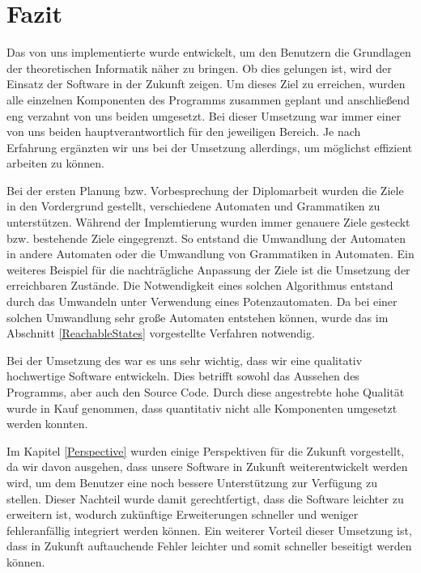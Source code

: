 



\chapter{Fazit}\label{Conclusion}

Das von uns implementierte \gtitool wurde entwickelt, um den Benutzern die
Grundlagen der theoretischen Informatik näher zu bringen. Ob dies gelungen ist,
wird der Einsatz der Software in der Zukunft zeigen. Um dieses Ziel zu erreichen,
wurden alle einzelnen Komponenten des Programms zusammen geplant und anschließend
eng verzahnt von uns beiden umgesetzt. Bei dieser Umsetzung war immer einer von
uns beiden hauptverantwortlich für den jeweiligen Bereich. Je nach Erfahrung
ergänzten wir uns bei der Umsetzung allerdings, um möglichst effizient arbeiten
zu können.\vspace{10pt}

Bei der ersten Planung bzw. Vorbesprechung der Diplomarbeit wurden die Ziele in
den Vordergrund gestellt, verschiedene Automaten und Grammatiken zu
unterstützen. Während der Implemtierung wurden immer genauere Ziele gesteckt
bzw. bestehende Ziele eingegrenzt. So entstand die Umwandlung der Automaten in
andere Automaten oder die Umwandlung von Grammatiken in Automaten. Ein weiteres
Beispiel für die nachträgliche Anpassung der Ziele ist die Umsetzung der
erreichbaren Zustände. Die Notwendigkeit eines solchen Algorithmus entstand
durch das Umwandeln unter Verwendung eines Potenzautomaten. Da bei einer
solchen Umwandlung sehr große Automaten entstehen können, wurde das im
Abschnitt \ref{ReachableStates} vorgestellte Verfahren notwendig.\vspace{10pt}

Bei der Umsetzung des \gtitools war es uns sehr wichtig, dass wir eine
qualitativ hochwertige Software entwickeln. Dies betrifft sowohl das
Aussehen des Programms, aber auch den Source Code. Durch diese angestrebte hohe
Qualität wurde in Kauf genommen, dass quantitativ nicht alle Komponenten
umgesetzt werden konnten.\vspace{10pt}

Im Kapitel \ref{Perspective} wurden einige Perspektiven für die Zukunft
vorgestellt, da wir davon ausgehen, dass unsere Software in Zukunft
weiterentwickelt werden wird, um dem Benutzer eine noch bessere Unterstützung zur
Verfügung zu stellen. Dieser Nachteil wurde damit gerechtfertigt, dass die
Software leichter zu erweitern ist, wodurch zukünftige Erweiterungen schneller
und weniger fehleranfällig integriert werden können. Ein weiterer Vorteil dieser
Umsetzung ist, dass in Zukunft auftauchende Fehler leichter und somit schneller
beseitigt werden können.\vspace{10pt}

